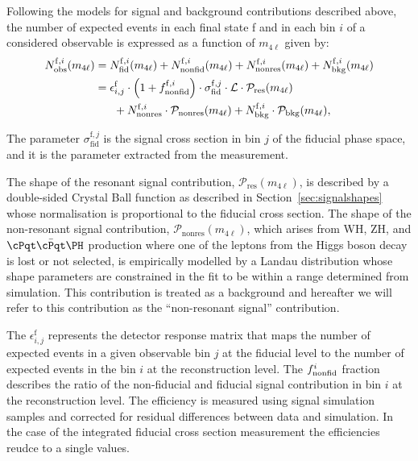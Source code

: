 Following the models for signal and background contributions described above, the number of expected events in each final state f and in each bin $i$ of a considered observable is expressed as a function of $m_{4\ell}$ given by: 
\begin{eqnarray}
\label{eqn:m4l}
\begin{aligned}
N_{\mathrm{obs}}^{\mathrm{f},i}(m_{4\ell}) &= N_{\mathrm{fid}}^{\mathrm{f},i}(m_{4\ell})+N_{\mathrm{nonfid}}^{\mathrm{f},i}(m_{4\ell})+N_{\mathrm{nonres}}^{\mathrm{f},i}(m_{4\ell})+N_{\mathrm{bkg}}^{\mathrm{f},i}(m_{4\ell}) \\
&=\epsilon_{i,j}^{\mathrm{f}} \cdot \left(1+f_{\rm nonfid}^{\mathrm{f},i} \right)\cdot\sigma_{\mathrm{fid}}^{\mathrm{f},j} \cdot \mathcal{L}\cdot\mathcal{P}_{\mathrm{res}}(m_{4\ell}) \\
&~~~~~+ N_{\mathrm{nonres}}^{\mathrm{f},i}\cdot\mathcal{P}_{\mathrm{nonres}}(m_{4\ell})+N_{\mathrm{bkg}}^{\mathrm{f},i}\cdot\mathcal{P}_{\mathrm{bkg}}(m_{4\ell}),
\end{aligned}
\end{eqnarray}

The parameter $\sigma_{\mathrm{fid}}^{\mathrm{f},j}$ is the signal cross section in bin $j$ of the fiducial phase space, and it is the parameter extracted from the measurement. 

The shape of the resonant signal contribution, $\mathcal{P}_{\mathrm{res}}(m_{4\ell})$, is described by a double-sided Crystal Ball function as described in Section~\ref{sec:signalshapes} whose normalisation is proportional to the fiducial cross section. The shape of the non-resonant signal contribution, $\mathcal{P}_{\mathrm{nonres}}(m_{4\ell})$, which arises from WH, ZH, and $\ttH$ production where one of the leptons from the Higgs boson decay is lost or not selected, is empirically modelled by a Landau distribution whose shape parameters are constrained in the fit to be within a range determined from simulation. This contribution is treated as a background and hereafter we will refer to this contribution as the ``non-resonant signal'' contribution.

The $\epsilon_{i,j}^{\mathrm{f}}$ represents the detector response matrix that maps the number of expected events in a given observable bin $j$ at the fiducial level to the number of expected events in the bin $i$ at the reconstruction level. The $f_{\rm nonfid}^{i}$ fraction describes the ratio of the non-fiducial and fiducial signal contribution in bin $i$ at the reconstruction level.  The efficiency is measured using signal simulation samples and corrected for residual differences between data and simulation. In the case of the integrated fiducial cross section measurement the efficiencies reudce to a single values.

